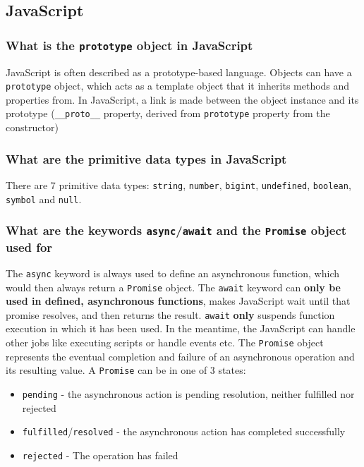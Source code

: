 \documentclass[12pt, a4paper]{article}
\newcommand{\code}[1]{\texttt{#1}}
\begin{document}
\pagebreak
{}
\subsection*{JavaScript}
\subsubsection*{What is the \code{prototype} object in JavaScript}
JavaScript is often described as a prototype-based language.
Objects can have a \code{prototype} object, which acts as a template object that it inherits methods and properties from.
In JavaScript, a link is made between the object instance and its prototype (\code{\_\_proto\_\_} property, derived from \code{prototype} property from the constructor)

\subsubsection*{What are the primitive data types in JavaScript}
There are 7 primitive data types: \code{string}, \code{number}, \code{bigint}, \code{undefined}, \code{boolean}, \code{symbol} and \code{null}.

\subsubsection*{What are the keywords \code{async}/\code{await} and the \code{Promise} object used for}
The \code{async} keyword is always used to define an asynchronous function, which would then always return a \code{Promise} object.\newline
The \code{await} keyword can \textbf{only be used in defined, asynchronous functions}, makes JavaScript wait until that promise resolves, and then returns the result.
\code{await} \textbf{only} suspends function execution in which it has been used.
In the meantime, the JavaScript can handle other jobs like executing scripts or handle events etc.\newline
The \code{Promise} object represents the eventual completion and failure of an asynchronous operation and its resulting value.
A \code{Promise} can be in one of 3 states:
\begin{itemize}
    \item \code{pending} - the asynchronous action is pending resolution, neither fulfilled nor rejected
    \item \code{fulfilled}/\code{resolved} - the asynchronous action has completed successfully
    \item \code{rejected} - The operation has failed
\end{itemize}
\end{document}
